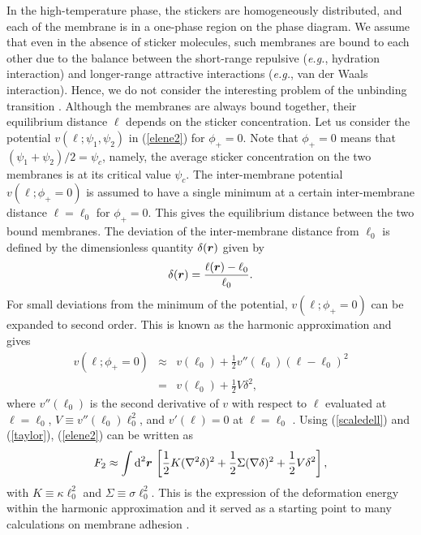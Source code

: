 In the high-temperature phase, the stickers are homogeneously
distributed, and each of the membrane is in a one-phase region on
the phase diagram. We assume that even in the absence of sticker
molecules, such membranes are bound to each other due to the
balance between the short-range repulsive ({\it e.g.}, hydration
interaction) and longer-range attractive interactions ({\it e.g.},
van der Waals interaction). Hence, we do not consider the
interesting problem of the unbinding transition
\cite{Lipowsky96,Lipowsky97,WNL}. Although the membranes are always
bound together, their equilibrium distance $\ell$ depends on the
sticker concentration.
Let us consider the potential $v(\ell; \psi_1, \psi_2)$ in 
(\ref{elene2}) for $\phi_+=0$. Note that $\phi_+=0$ means that
$(\psi_1+\psi_2)/2=\psi_c$, namely, the average sticker
concentration on the two membranes is at its critical value
$\psi_c$. The inter-membrane potential $v(\ell; \phi_+=0)$ is assumed to
have a single minimum at a certain inter-membrane distance
$\ell=\ell_0$ for $\phi_+=0$. This gives the equilibrium distance
between the two bound membranes. The deviation of the
inter-membrane distance from $\ell_0$ is defined by the
dimensionless quantity $\delta(\mbox{\boldmath $r$})$ given by
%
\begin{equation}
\delta(\mbox{\boldmath $r$}) = \frac{\ell(\mbox{\boldmath $r$})
- \ell_0}{\ell_0}. \label{scaledell}
\end{equation}
%
For small deviations from the minimum of the potential,
$v(\ell; \phi_+=0)$ can be expanded to second order.
This is known as the harmonic approximation and gives
%
\begin{eqnarray}
v(\ell; \phi_+=0) & \approx & v(\ell_0) + 
\frac{1}{2}v''(\ell_0) (\ell - \ell_0)^2
\nonumber  \\
& = & v(\ell_0) + \frac{1}{2}V \delta^2,
\label{taylor}
\end{eqnarray}
%
where $v''(\ell_0)$ is the second derivative of $v$ with respect to $\ell$
evaluated at $\ell = \ell_0$, $V \equiv  v''(\ell_0) \ell_0^2$, and
$v'(\ell)=0$ at $\ell=\ell_0$ \cite{numbers}.
Using (\ref{scaledell}) and (\ref{taylor}), (\ref{elene2}) can be written as
\begin{equation}
F_2 \approx \int \mbox{d}^2 \mbox{\boldmath $r$} \, \left[
\frac{1}{2} K (\nabla^2 \delta)^2  + \frac{1}{2} \Sigma (\nabla
\delta)^2  + \frac{1}{2}V \delta^2 \right], \label{elene3}
\end{equation}
with $K \equiv \kappa \ell_0^2$ and $\Sigma \equiv\sigma \ell_0^2$.
This is the expression of the deformation energy within the harmonic
approximation and it served as a starting point to many calculations
on membrane adhesion \cite{SL,BGP,SA}.



